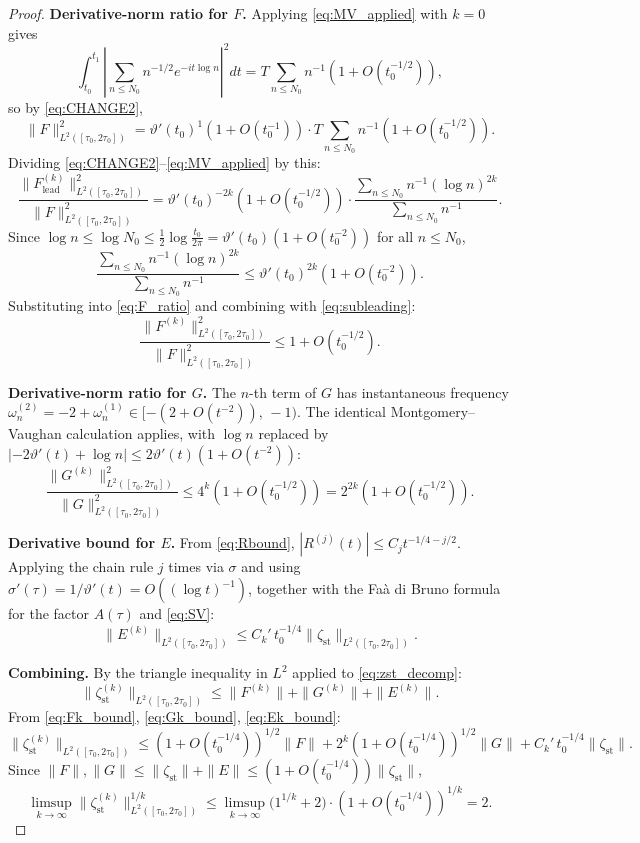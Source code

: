 \documentclass[11pt]{article}
\theoremstyle{definition}
\begin{document}
\begin{proof}
\textbf{Derivative-norm ratio for $F$.}
Applying \eqref{eq:MV_applied} with $k=0$ gives
\[
\int_{t_0}^{t_1}
\left|\sum_{n\le N_0}n^{-1/2}e^{-it\log n}\right|^2 dt
=T\sum_{n\le N_0}n^{-1}(1+O(t_0^{-1/2})),
\]
so by \eqref{eq:CHANGE2},
\[
\|F\|_{L^2([\tau_0,2\tau_0])}^2
=\vartheta'(t_0)^1(1+O(t_0^{-1}))\cdot T\sum_{n\le N_0}n^{-1}
(1+O(t_0^{-1/2})).
\]
Dividing \eqref{eq:CHANGE2}--\eqref{eq:MV_applied} by this:
\begin{equation}\label{eq:F_ratio}
\frac{\|F^{(k)}_{\mathrm{lead}}\|_{L^2([\tau_0,2\tau_0])}^2}
     {\|F\|_{L^2([\tau_0,2\tau_0])}^2}
=\vartheta'(t_0)^{-2k}(1+O(t_0^{-1/2}))
\cdot\frac{\sum_{n\le N_0}n^{-1}(\log n)^{2k}}{\sum_{n\le N_0}n^{-1}}.
\end{equation}
Since $\log n\le\log N_0\le\tfrac12\log\tfrac{t_0}{2\pi}
=\vartheta'(t_0)(1+O(t_0^{-2}))$ for all $n\le N_0$,
\[
\frac{\sum_{n\le N_0}n^{-1}(\log n)^{2k}}{\sum_{n\le N_0}n^{-1}}
\le\vartheta'(t_0)^{2k}(1+O(t_0^{-2})).
\]
Substituting into \eqref{eq:F_ratio} and combining with
\eqref{eq:subleading}:
\begin{equation}\label{eq:Fk_bound}
\frac{\|F^{(k)}\|_{L^2([\tau_0,2\tau_0])}^2}
     {\|F\|_{L^2([\tau_0,2\tau_0])}^2}
\le 1+O(t_0^{-1/2}).
\end{equation}

\textbf{Derivative-norm ratio for $G$.}
The $n$-th term of $G$ has instantaneous frequency
$\omega_n^{(2)}=-2+\omega_n^{(1)}\in[-(2+O(t^{-2})),\,-1)$.
The identical Montgomery--Vaughan calculation applies, with
$\log n$ replaced by $|{-2\vartheta'(t)+\log n}|\le 2\vartheta'(t)(1+O(t^{-2}))$:
\begin{equation}\label{eq:Gk_bound}
\frac{\|G^{(k)}\|_{L^2([\tau_0,2\tau_0])}^2}
     {\|G\|_{L^2([\tau_0,2\tau_0])}^2}
\le 4^k(1+O(t_0^{-1/2}))
=2^{2k}(1+O(t_0^{-1/2})).
\end{equation}

\textbf{Derivative bound for $E$.}
From \eqref{eq:Rbound}, $|R^{(j)}(t)|\le C_j t^{-1/4-j/2}$.
Applying the chain rule $j$ times via $\sigma$ and using
$\sigma'(\tau)=1/\vartheta'(t)=O((\log t)^{-1})$,
together with the Fa\`a di Bruno formula for the factor $A(\tau)$
and \eqref{eq:SV}:
\begin{equation}\label{eq:Ek_bound}
\|E^{(k)}\|_{L^2([\tau_0,2\tau_0])}\le C_k'\,t_0^{-1/4}\|\zeta_{\mathrm{st}}\|_{L^2([\tau_0,2\tau_0])}.
\end{equation}

\textbf{Combining.}
By the triangle inequality in $L^2$ applied to
\eqref{eq:zst_decomp}:
\[
\|\zeta_{\mathrm{st}}^{(k)}\|_{L^2([\tau_0,2\tau_0])}
\le\|F^{(k)}\|+\|G^{(k)}\|+\|E^{(k)}\|.
\]
From \eqref{eq:Fk_bound}, \eqref{eq:Gk_bound}, \eqref{eq:Ek_bound}:
\[
\|\zeta_{\mathrm{st}}^{(k)}\|_{L^2([\tau_0,2\tau_0])}
\le(1+O(t_0^{-1/4}))^{1/2}\|F\|
+2^k(1+O(t_0^{-1/4}))^{1/2}\|G\|
+C_k'\,t_0^{-1/4}\|\zeta_{\mathrm{st}}\|.
\]
Since $\|F\|,\|G\|\le\|\zeta_{\mathrm{st}}\|+\|E\|
\le(1+O(t_0^{-1/4}))\|\zeta_{\mathrm{st}}\|$,
\begin{equation}\label{eq:DB}
\limsup_{k\to\infty}
\|\zeta_{\mathrm{st}}^{(k)}\|_{L^2([\tau_0,2\tau_0])}^{1/k}
\le\limsup_{k\to\infty}
\bigl(1^{1/k}+2\bigr)\cdot(1+O(t_0^{-1/4}))^{1/k}
=2.
\end{equation}


\end{proof}
\end{document}
